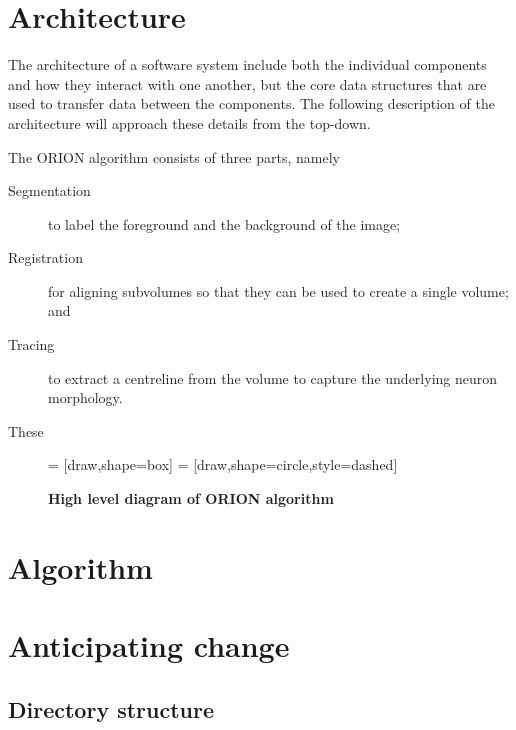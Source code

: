 \section{Architecture}

The architecture of a software system include both the individual
components and how they interact with one another, but the core
data structures that are used to transfer data between the
components. The following description of the architecture will
approach these details from the top-down.

The ORION algorithm consists of three parts, namely
\begin{description}
	\item[Segmentation] to label the
		foreground and the background of the image;
	\item[Registration] for aligning subvolumes so
		that they can be used to create a single volume;
		and
	\item[Tracing] to extract a centreline from the volume to
		capture the underlying neuron morphology.
\end{description}
These 

\begin{figure}
	 = [draw,shape=box]
	 = [draw,shape=circle,style=dashed]
\centering

\caption[High level diagram of ORION algorithm]{\textbf{High level
diagram of ORION algorithm}}\label{fig:high-level-arch}
\end{figure}

\section{Algorithm}


\section{Anticipating change}


\subsection{Directory structure}

\begin{description}[font=\tt]
\item[lib]
\item[lib/t]
\item[src]
\end{description}



